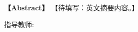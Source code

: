 \newpage

\centerline{\fangsong\bf{}}


\vskip 20bp

\hspace{4bp} {\textbf{【Abstract】}}
【待填写：英文摘要内容。】

\vskip 10bp

 \ThesisKeywordsEn

\vskip 20bp

\begin{flushright}
	\kaishu 指导教师:\ \ThesisAdvisor \hspace{3cm}{ }
\end{flushright}

\label{lastpage}
